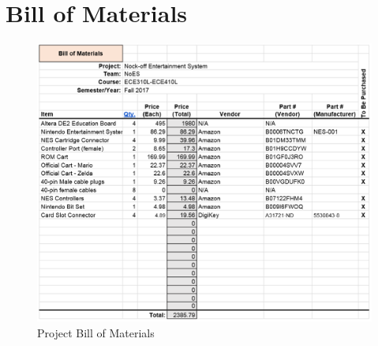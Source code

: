 \documentclass[a4paper]{article}
\begin{document}
\section{Bill of Materials}
\begin{figure}[H]
\centering
\includegraphics[width=\textwidth]{bom.png}
\caption{\label{fig:Table}Project Bill of Materials}
\end{figure}



\end{document}
